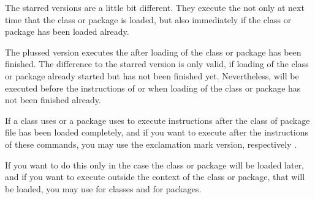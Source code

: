 The starred versions
are a little bit different. They execute the  not only at
next time that the class or package is loaded, but also immediately if the
class or package has been loaded already.

The
plussed version executes the
 after loading of the class or package has been
finished. The difference to the starred version is only valid, if loading of
the class or package already started but has not been finished
yet. Nevertheless,  will be executed before the
instructions of  or  when loading of
the class or package has not been finished already.

If a class uses
 or a package uses  to execute
instructions after the class of package file has been loaded completely, and
if you want to execute  after the instructions of these
commands, you may use the exclamation mark version,
 respectively
.

If you
want to do this only in the case the class or package will be loaded later,
and if you want to execute  outside the context of the
class or package, that will be loaded, you may use
 for classes and
 for packages.

